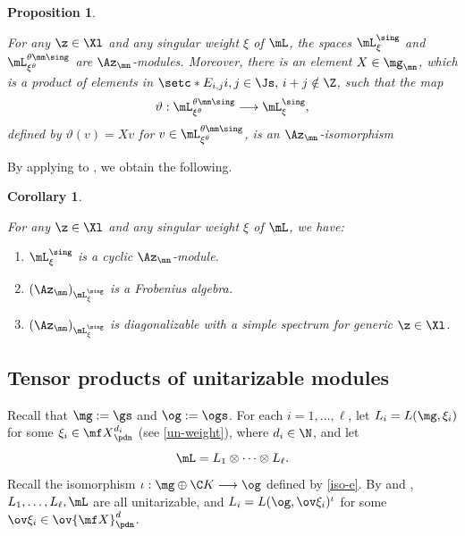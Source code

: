 \documentclass[11pt, reqno]{amsart}
\newtheorem{cor}[thm]{Corollary}
\newtheorem{prop}[thm]{Proposition}
\theoremstyle{definition}
\theoremstyle{remark}
\numberwithin{equation}{section}
\begin{document}
\begin{prop} \label{A-iso-poly}

For any $\z \in \Xl$ and any singular weight $\xi$ of $\mL$, the spaces $\mL_{\xi}^{\sing}$ and $\mL_{\xi^\theta}^{\theta \mm\sing}$ are $\Az_\mn$-modules.
Moreover, there is an element $X \in \mg_\mn$, which is a product of elements in $\setc*{E_{i,j} }{  i,j \in \Js, \, i+j \notin \Z}$, such that the map
$$
\vartheta: \mL_{\xi^\theta}^{\theta \mm\sing} \longrightarrow \mL_{\xi}^{\sing},
$$
defined by $\vartheta(v)=X v$ for $v \in  \mL_{\xi^\theta}^{\theta \mm\sing}$, is an $\Az_\mn$-isomorphism
\end{prop}

By applying  to , we obtain the following.

\begin{cor} \label{ChL25-weight}

For any $\z \in \Xl$ and any singular weight $\xi$ of $\mL$, we have:

\begin{enumerate}[\normalfont(i)]
\item $\mL_\xi^{\sing}$ is a cyclic $\Az_\mn$-module.

\item $(\Az_\mn)_{\mL_\xi^{\sing}}$ is a Frobenius algebra.

\item $(\Az_\mn)_{\mL_\xi^{\sing}}$ is diagonalizable with a simple spectrum for generic $\z \in \Xl$.

\end{enumerate}

\end{cor}



\subsection{Tensor products of unitarizable modules} \label{uni}

Recall that $\mg:=\gs$ and $\og:=\ogs$.
For each $i=1, \ldots, \ell$, let $L_i=L(\mg, \xi_i)$ for some $\xi_i \in {\mf X}^{d_i}_\pdn$ (see \eqref{un-weight}), where $d_i \in \N$, and let
$$
\mL =L_1 \otimes \cdots \otimes  L_\ell.
$$
Recall the isomorphism $\iota: \mg\oplus \C K \longrightarrow \og$ defined by \eqref{iso-e}.
By  and , $L_1,\ldots, L_\ell, \mL$ are all unitarizable, and $L_i=L(\og, \ov\xi_i)^\iota$ for some $\ov\xi_i \in \ov{\mf X}^d_\pdn$.
\end{document}
